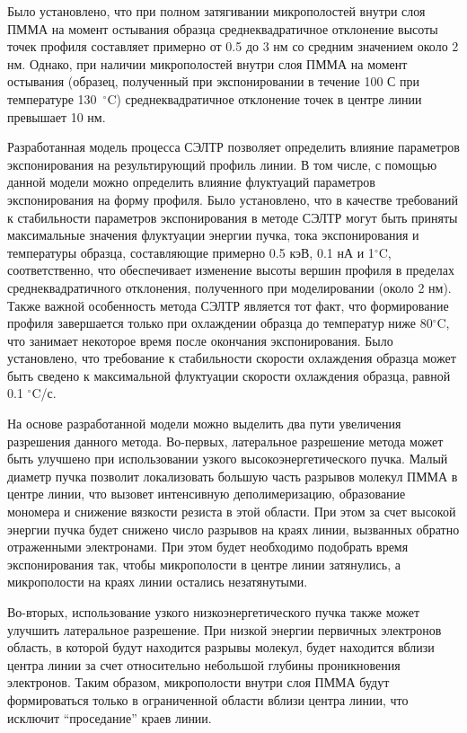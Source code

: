 Было установлено, что при полном затягивании микрополостей внутри слоя ПММА на момент остывания образца среднеквадратичное отклонение высоты точек профиля составляет примерно от 0.5 до 3 нм со средним значением около 2 нм. Однако, при наличии микрополостей внутри слоя ПММА на момент остывания (образец, полученный при экспонировании в течение 100 С при температуре 130~$^\circ$C) среднеквадратичное отклонение точек в центре линии превышает 10 нм.

Разработанная модель процесса СЭЛТР позволяет определить влияние параметров экспонирования на результирующий профиль линии. В том числе, с помощью данной модели можно определить влияние флуктуаций параметров экспонирования на форму профиля.
Было установлено, что в качестве требований к стабильности параметров экспонирования в методе СЭЛТР могут быть приняты максимальные значения флуктуации энергии пучка, тока экспонирования и температуры образца, составляющие примерно 0.5 кэВ, 0.1 нА и 1$^\circ$C, соответственно, что обеспечивает изменение высоты вершин профиля в пределах среднеквадратичного отклонения, полученного при моделировании (около 2 нм). Также важной особенность метода СЭЛТР является тот факт, что формирование профиля завершается только при охлаждении образца до температур ниже 80$^\circ$C, что занимает некоторое время после окончания экспонирования. Было установлено, что требование к стабильности скорости охлаждения образца может быть сведено к максимальной флуктуации скорости охлаждения образца, равной 0.1 $^\circ$C/с.

На основе разработанной модели можно выделить два пути увеличения разрешения данного метода. Во-первых, латеральное разрешение метода может быть улучшено при использовании узкого высокоэнергетического пучка. Малый диаметр пучка позволит локализовать большую часть разрывов молекул ПММА в центре линии, что вызовет интенсивную деполимеризацию, образование мономера и снижение вязкости резиста в этой области. При этом за счет высокой энергии пучка будет снижено число разрывов на краях линии, вызванных обратно отраженными электронами. При этом будет необходимо подобрать время экспонирования так, чтобы микрополости в центре линии затянулись, а микрополости на краях линии остались незатянутыми.

Во-вторых, использование узкого низкоэнергетического пучка также может улучшить латеральное разрешение. При низкой энергии первичных электронов область, в которой будут находится разрывы молекул, будет находится вблизи центра линии за счет относительно небольшой глубины проникновения электронов. Таким образом, микрополости внутри слоя ПММА будут формироваться только в ограниченной области вблизи центра линии, что исключит ``проседание'' краев линии.


